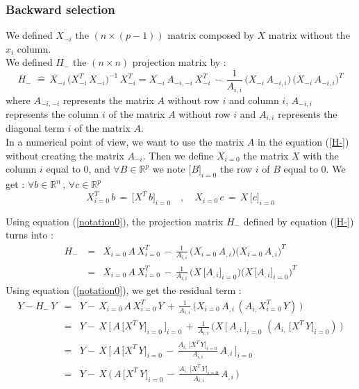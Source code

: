 \subsubsection{Backward selection}

We defined $X_{-i}$ the $(n \times (p-1))$ matrix composed by $X$ matrix without the $x_i$ column.\\ 
We defined $H_{-}$ the $(n\times n)$ projection matrix by :
 \begin{equation}
\label{H-}
H_{-}\, \,\hat{=}\, X_{-i}\,\big(X^T_{-i} \,X_{-i}\big)^{-1} \,X^T_{-i}
= X_{-i}\,A_{-i,-i} \, X^T_{-i} \,-\,\frac {1}{A_{i,i}}\,\big(X_{-i}\, A_{-i,i}\big)\, \big(X_{-i}\, A_{-i,i}\big)^T 
 \end{equation}
where $A_{-i,-i}$ represents the matrix $A$ without row $i$ and column $i$,
$A_{-i,i}$ represents the column $i$ of the matrix $A$ without row $i$ and $A_{i,i}$ represents the diagonal term $i$ of the matrix $A$.\\

In a numerical point of view, we want to use the matrix $A$ in the equation (\ref{H-}) without creating the matrix $A_{-i }$.
Then we define $X_{i=0}$ the matrix $X$ with the column $i$ equal to $0$, and $\forall B \in \mathbb{R}^p$ we note $\big[B\big]_{i=0}$ the row $i$ of $B$ equal to $0$. 
We get : $\forall b \in \mathbb{R}^n\,,\, \forall c \in \mathbb{R}^p $
 \begin{equation}
\label{notation0}
X_{i=0}^T\,b \,=\,\big[X^T\,b\big]_{i=0} \quad,\quad X_{i=0}\,c \,=\,X\,\big[c\big]_{i=0}
 \end{equation}


 Using equation (\ref{notation0}), the projection matrix $H_{-}$ defined by equation (\ref{H-}) turns into  :
 \begin{eqnarray}
H_{-}\, & = & X_{i=0}\,A\,X_{i=0}^T \,-\,\frac {1}{A_{i,i}}\,  \big(X_{i=0}\,A_{,i}\big) \big(X_{i=0}\,A_{,i}\big)^T   \\
& = & X_{i=0}\,A\,X_{i=0}^T \,-\,\frac {1}{A_{i,i}}\,  \big(X\,\big[A_{,i}\big]_{i=0}  \big) \big(X\,\big[A_{,i}\big]_{i=0} \big)^T 
\end{eqnarray}
 Using equation (\ref{notation0}), we get the residual term : 
 \begin{eqnarray}
Y-H_{-}\,Y & = &Y- \,X_{i=0}\,A\,X_{i=0}^T\,Y \,+\,\frac {1}{A_{i,i}}\,  \big(X_{i=0}\,A_{,i}\,(A_{i,} X_{i=0}^T\,Y)\,\big)   \\
 & = & Y-\,X\,\big[\,A\,\big[X^T\,Y\big]_{i=0}\,\big]_{i=0} \,+\,\frac {1}{A_{i,i}}\,  \big( X\,\big[\,A_{,i}\,\big]_{i=0}\,\,(A_{i,} \,\big[X^T\,Y\big]_{i=0})\,\big)   \\
 & = & Y-\,X\,\big[\,A\,\big[X^T\,Y\big]_{i=0}\, -\,\frac {A_{i,} \,\big[X^T\,Y\big]_{i=0}}{A_{i,i}}\,A_{,i}\,      \big]_{i=0} \\
\label{defH-Y}
 & = & Y- \,X\,\big(\,A\,\big[X^T\,Y\big]_{i=0}\, -\,\frac {A_{i,} \,\big[X^T\,Y\big]_{i=0}}{A_{i,i}}\,A_{,i}\,\big)
\end{eqnarray}

